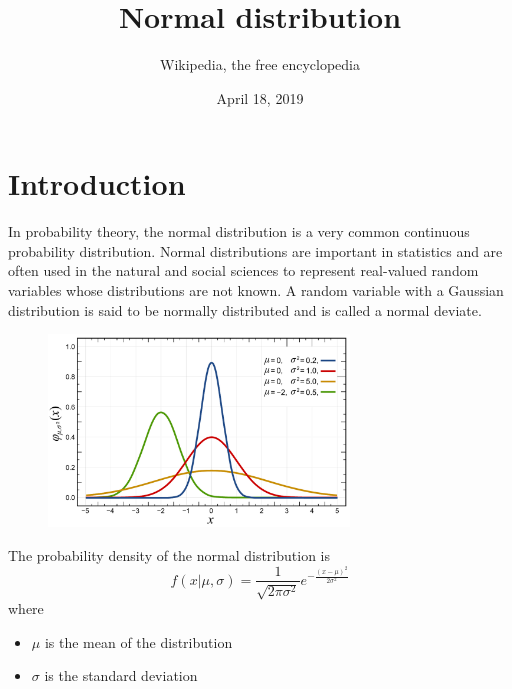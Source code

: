 \documentclass[12pt,a4paper]{article}
\title{Normal distribution}
\author{Wikipedia, the free encyclopedia}
\date{April 18, 2019}
\begin{document}
\maketitle
\section{Introduction}
In probability theory, the normal distribution is a very common continuous probability
distribution. Normal distributions are important in statistics and are often used in the natural
and social sciences to represent real-valued random variables whose distributions are not known.
A random variable with a Gaussian distribution is said to be normally distributed and is called a
normal deviate.

\begin{figure}[h]
  \centering
  \includegraphics[width=8cm]{normal-distribution-PDF.pdf}
\end{figure}

The probability density of the normal distribution is
\begin{equation}
  f(x|\mu,\sigma)
  = \frac{1}{\sqrt{2\pi\sigma^2}}
    e^{-\frac{(x-\mu)^2}{2\sigma^2}}
\end{equation}
where
\begin{itemize}
  \item $\mu$ is the mean of the distribution
  \item $\sigma$ is the standard deviation
\end{itemize}
\end{document}
